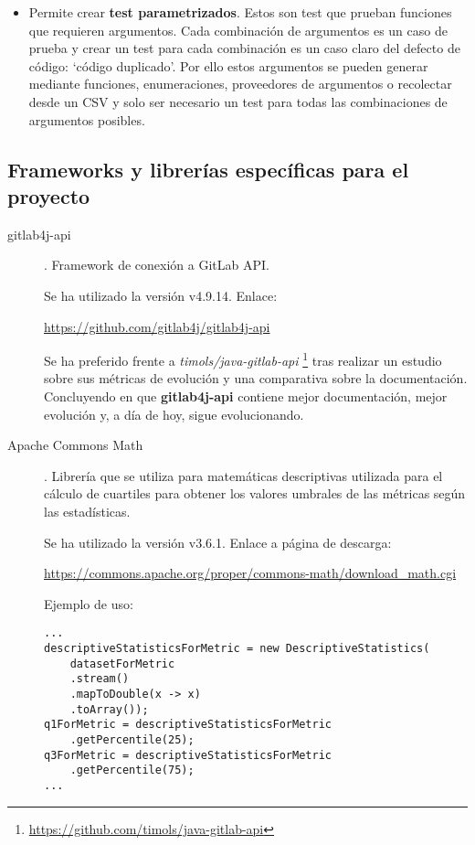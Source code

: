 \begin{description}
\begin{itemize}
			\item Permite crear \textbf{test parametrizados}. Estos son test que prueban funciones que requieren argumentos. Cada combinación de argumentos es un caso de prueba y crear un test para cada combinación es un caso claro del defecto de código: `código duplicado'. Por ello estos argumentos se pueden generar mediante funciones, enumeraciones, proveedores de argumentos o recolectar desde un CSV y solo ser necesario un test para todas las combinaciones de argumentos posibles.
		\end{itemize}
\end{description}
\subsection{Frameworks y librerías específicas para el proyecto}
\begin{description}
	\item[gitlab4j-api]. Framework de conexión a GitLab API. 
	
		Se ha utilizado la versión  v4.9.14. Enlace:
		
		\url{https://github.com/gitlab4j/gitlab4j-api}
		
		Se ha preferido frente a \textit{timols/java-gitlab-api} \footnote{\url{https://github.com/timols/java-gitlab-api}} tras realizar un estudio sobre sus métricas de evolución y una comparativa sobre la documentación. Concluyendo en que \textbf{gitlab4j-api} contiene mejor documentación, mejor evolución y, a día de hoy, sigue evolucionando.
		
	\item[Apache Commons Math]. Librería que se utiliza para matemáticas descriptivas utilizada para el cálculo de cuartiles para obtener los valores umbrales de las métricas según las estadísticas. 
	
		Se ha utilizado la versión  v3.6.1. Enlace a página de descarga:
	
		\url{https://commons.apache.org/proper/commons-math/download_math.cgi}
		
		Ejemplo de uso:
		
\begin{lstlisting}
...
descriptiveStatisticsForMetric = new DescriptiveStatistics(
	datasetForMetric
	.stream()
	.mapToDouble(x -> x)
	.toArray());
q1ForMetric = descriptiveStatisticsForMetric
	.getPercentile(25);
q3ForMetric = descriptiveStatisticsForMetric
	.getPercentile(75);
...
\end{lstlisting}
\end{description}
